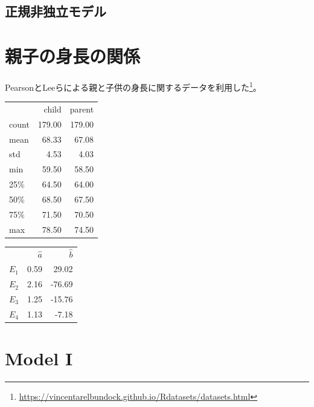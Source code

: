 \subsection{正規非独立モデル}



\section{親子の身長の関係}


PearsonとLeeらによる親と子供の身長に関するデータを利用した\footnote{\url{https://vincentarelbundock.github.io/Rdatasets/datasets.html}}。
\begin{table}[http]
 \centering
 \begin{tabular}{lrr}
  {} &  child &  parent \\
  count & 179.00 &  179.00 \\
  mean  &  68.33 &   67.08 \\
  std   &   4.53 &    4.03 \\
  min   &  59.50 &   58.50 \\
  25\%   &  64.50 &   64.00 \\
  50\%   &  68.50 &   67.50 \\
  75\%   &  71.50 &   70.50 \\
  max   &  78.50 &   74.50 \\
 \end{tabular}
\end{table}


\begin{table}[http]
 \centering
\begin{tabular}{lrr}
{} &    $\hat{a}$ &      $\hat{b}$ \\
$E_1$ & 0.59 &  29.02 \\
 $E_2$ & 2.16 & -76.69 \\
$E_3$ & 1.25 & -15.76 \\
$E_4$ & 1.13 &  -7.18 \\
\end{tabular}
\end{table}




\section{Model I}

